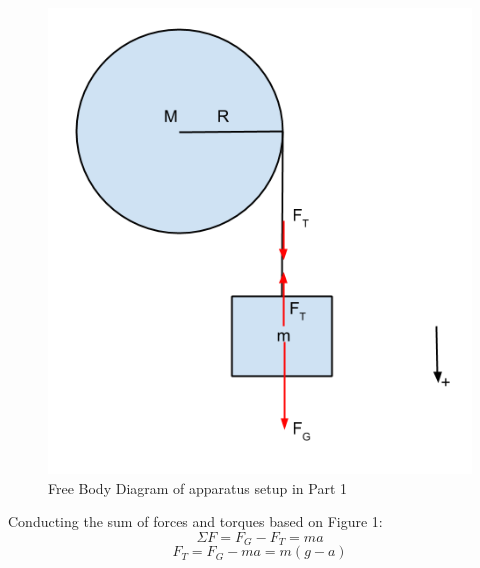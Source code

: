 \documentclass[10pt, letterpaper]{article}
\begin{document}
\begin{figure}[!htb]
\centering
\includegraphics[scale=0.5]{Lab2_drawing.png}
\caption{Free Body Diagram of apparatus setup in Part 1}
\end{figure}

\clearpage

 Conducting the sum of forces and torques based on Figure 1: \\
    \[ \Sigma F = F_G - F_T = ma \]
    \[F_T = F_G - ma = m(g-a) \] \\
\end{document}

